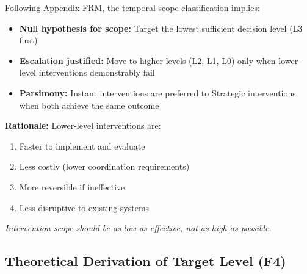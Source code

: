 \begin{tcolorbox}[colback=red!5!white, colframe=red!75!black,
    title=\textbf{Methodological Note: XVIII Exclusion Principle for Scope}]

Following Appendix FRM, the temporal scope classification implies:

\begin{itemize}[nosep]
    \item \textbf{Null hypothesis for scope:} Target the lowest sufficient decision level (L3 first)
    \item \textbf{Escalation justified:} Move to higher levels (L2, L1, L0) only when lower-level interventions demonstrably fail
    \item \textbf{Parsimony:} Instant interventions are preferred to Strategic interventions when both achieve the same outcome
\end{itemize}

\textbf{Rationale:} Lower-level interventions are:
\begin{enumerate}[nosep]
    \item Faster to implement and evaluate
    \item Less costly (lower coordination requirements)
    \item More reversible if ineffective
    \item Less disruptive to existing systems
\end{enumerate}

\textit{Intervention scope should be as low as effective, not as high as possible.}
\end{tcolorbox}


\subsection{Theoretical Derivation of Target Level (F4)}
\label{sec:hhh-level}

